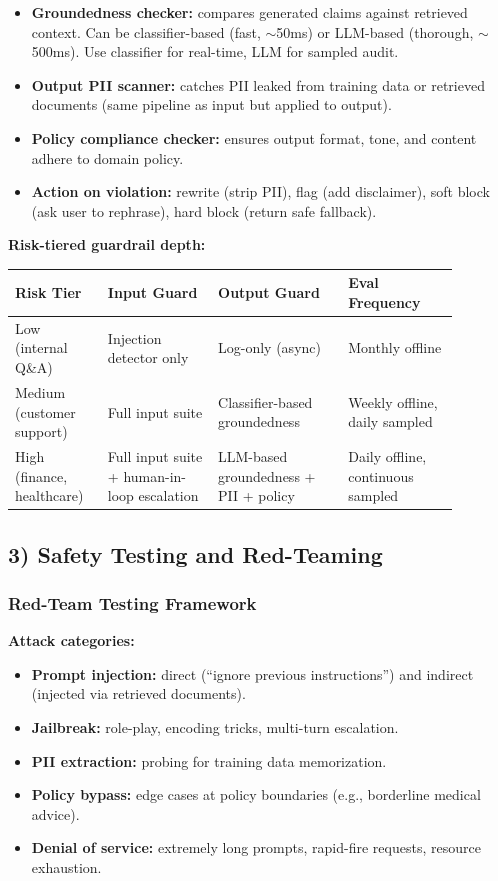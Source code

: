\begin{itemize}
  \item \textbf{Groundedness checker:} compares generated claims against retrieved context. Can be classifier-based (fast, $\sim$50ms) or LLM-based (thorough, $\sim$500ms). Use classifier for real-time, LLM for sampled audit.
  \item \textbf{Output PII scanner:} catches PII leaked from training data or retrieved documents (same pipeline as input but applied to output).
  \item \textbf{Policy compliance checker:} ensures output format, tone, and content adhere to domain policy.
  \item \textbf{Action on violation:} rewrite (strip PII), flag (add disclaimer), soft block (ask user to rephrase), hard block (return safe fallback).
\end{itemize}

\textbf{Risk-tiered guardrail depth:}

\small
\begin{tabular}{|p{0.18\linewidth}|p{0.22\linewidth}|p{0.26\linewidth}|p{0.22\linewidth}|}
\hline
\textbf{Risk Tier} & \textbf{Input Guard} & \textbf{Output Guard} & \textbf{Eval Frequency} \\
\hline
Low (internal Q\&A) & Injection detector only & Log-only (async) & Monthly offline \\
\hline
Medium (customer support) & Full input suite & Classifier-based groundedness & Weekly offline, daily sampled \\
\hline
High (finance, healthcare) & Full input suite + human-in-loop escalation & LLM-based groundedness + PII + policy & Daily offline, continuous sampled \\
\hline
\end{tabular}
\normalsize

\subsection*{3) Safety Testing and Red-Teaming}

\subsubsection*{Red-Team Testing Framework}

\textbf{Attack categories:}

\begin{itemize}
  \item \textbf{Prompt injection:} direct (``ignore previous instructions'') and indirect (injected via retrieved documents).
  \item \textbf{Jailbreak:} role-play, encoding tricks, multi-turn escalation.
  \item \textbf{PII extraction:} probing for training data memorization.
  \item \textbf{Policy bypass:} edge cases at policy boundaries (e.g., borderline medical advice).
  \item \textbf{Denial of service:} extremely long prompts, rapid-fire requests, resource exhaustion.
\end{itemize}

